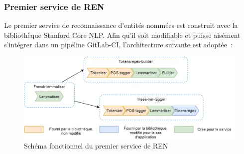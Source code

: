 \subsubsection{Premier service de REN}
Le premier service de reconnaissance d'entités nommées est construit avec la bibliothèque Stanford Core NLP. Afin qu'il soit modifiable et puisse aisément s'intégrer dans un pipeline GitLab-CI, l'architecture suivante est adoptée~:

\begin{figure}[H]
    \centering
    \includegraphics[scale=0.38]{images/Concept-tagger.png}
    \caption{Schéma fonctionnel du premier service de REN}
    \label{fig:premier-pipeline}
\end{figure}
\vspace{10pt}

